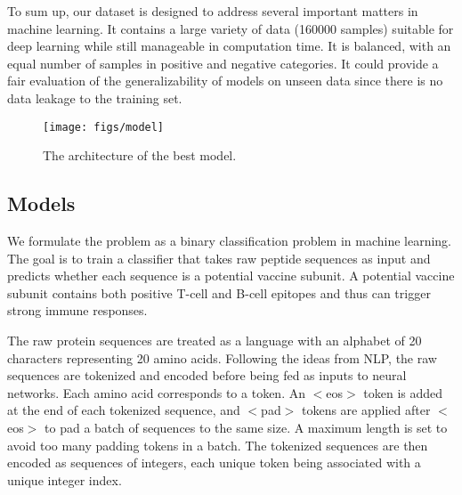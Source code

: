 \documentclass[conference]{IEEEtran}
\begin{document}
To sum up, our dataset is designed to address several important matters in machine learning. It contains a large variety of data (160000 samples) suitable for deep learning while still manageable in computation time. It is balanced, with an equal number of samples in positive and negative categories. It could provide a fair evaluation of the generalizability of models on unseen data since there is no data leakage to the training set.

\begin{figure*}
\texttt{[image: figs/model]}
\caption{The architecture of the best model.}
\label{fig1}
\end{figure*}

\subsection{Models}
We formulate the problem as a binary classification problem in machine learning. The goal is to train a classifier that takes raw peptide sequences as input and predicts whether each sequence is a potential vaccine subunit. A potential vaccine subunit contains both positive T-cell and B-cell epitopes and thus can trigger strong immune responses.

The raw protein sequences are treated as a language with an alphabet of 20 characters representing 20 amino acids. Following the ideas from NLP, the raw sequences are tokenized and encoded before being fed as inputs to neural networks. Each amino acid corresponds to a token. An $<$eos$>$ token is added at the end of each tokenized sequence, and $<$pad$>$ tokens are applied after $<$eos$>$ to pad a batch of sequences to the same size. A maximum length is set to avoid too many padding tokens in a batch. The tokenized sequences are then encoded as sequences of integers, each unique token being associated with a unique integer index.
\end{document}
